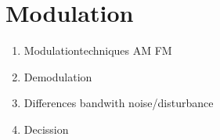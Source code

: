 \section{Modulation}

\begin{enumerate}
  \item Modulationtechniques
  \subitem AM
  \subitem FM
  \item Demodulation
  \item Differences
  \subitem bandwith
  \subitem noise/disturbance
  \item Decission
\end{enumerate}